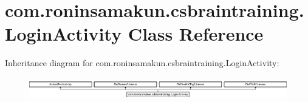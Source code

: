\section{com.\+roninsamakun.\+csbraintraining.\+Login\+Activity Class Reference}
\label{classcom_1_1roninsamakun_1_1csbraintraining_1_1_login_activity}
Inheritance diagram for com.\+roninsamakun.\+csbraintraining.\+Login\+Activity\+:\begin{figure}[H]
\begin{center}
\leavevmode
\includegraphics[height=0.965517cm]{classcom_1_1roninsamakun_1_1csbraintraining_1_1_login_activity}
\end{center}
\end{figure}

